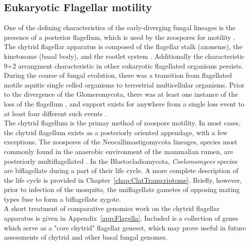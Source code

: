 \subsection{Eukaryotic Flagellar motility}
One of the defining characteristics of the early-diverging fungal lineages is the presence of a posterior flagellum, which is used by the zoospores for motility \cite{Koch1958}. The chytrid flagellar apparatus is composed of the flagellar stalk (axoneme), the kinetosome (basal body), and the rootlet system \cite{Barr1981}. Additionally the characteristic 9+2 arrangment characteristic in other eukaryotic flagellated organisms persists.\\
\indent During the course of fungal evolution, there was a transition from flagellated motile aquitic single celled organisms to terrestrial multicellular organisms. Prior to the divergence of the Glomeromycota, there was at least one instance of the loss of the flagellum \cite{}, and support exists for anywhere from a single loss event \cite{Liu2006} to at least four different such events \cite{James2006}.\\
\indent The chytrid flagellum is the primay method of zoospore motility. In most cases, the chytrid flagellum exists as a posteriorly oriented appendage, with a few exceptions. The zoospores of the Neocallimastigomycota lineages, species most commonly found in the anaerobic environment of the mammalian rumen, are posteriorly multiflagellated \cite{}. In the Blastocladiomycota, \textit{Coelomomyces} species are biflagellate during a part of their life cycle. A more complete description of the life cycle is provided in Chapter~\ref{chap:ClatTranscriptome}. Briefly, however, prior to infection of the mosquito, the uniflagellate gametes of opposing mating types fuse to form a biflagellate zygote. \cite{}\\ 
\indent A short treatment of comparative genomics work on the chytrid flagellar apparatus is given in Appendix~\ref{app:Flagella}. Included is a collection of genes which serve as a "core chytrid" flagellar geneset, which may prove useful in future assessments of chytrid and other basal fungal genomes.\\
